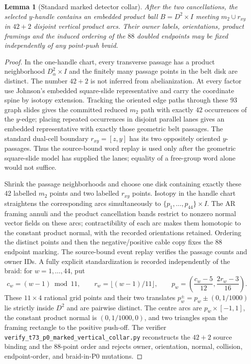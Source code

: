 \documentclass[11pt]{amsart}
\newtheorem{lemma}[theorem]{Lemma}
\theoremstyle{definition}
\theoremstyle{remark}
\begin{document}
\begin{lemma}[Standard marked detector collar]
\label{lem:marked-detector-collar}
After the two cancellations, the selected $y$-handle contains an embedded
product ball $B=D^2\times I$ meeting $m_2\cup r_{xy}$ in $42+2$ disjoint
vertical product arcs.  Their owner labels, orientations, product framings and
the induced ordering of the $88$ doubled endpoints may be fixed independently
of any point-push braid.
\end{lemma}

\begin{proof}
In the one-handle chart, every transverse passage has a product neighborhood
$D^2_\alpha\times I$ and the finitely many passage points in the belt disk are
distinct.  The number $42+2$ is not inferred from abelianization.  At every
factor use Johnson's embedded square-slide representative and carry the
coordinate spine by isotopy extension.  Tracking the oriented edge paths
through these $93$ graph slides gives the committed reduced $m_2$ path with
exactly $42$ occurrences of the $y$-edge; placing repeated occurrences in
disjoint parallel lanes gives an embedded representative with exactly those
geometric belt passages.  The standard dual-cell boundary
$r_{xy}=[z,y]$ has its two oppositely oriented $y$-passages.  Thus the
source-bound word replay is used only after the geometric square-slide model
has supplied the lanes; equality of a free-group word alone would not suffice.

Shrink the passage neighborhoods and choose one disk containing exactly these
42 labelled $m_2$ points and two labelled $r_{xy}$ points.  Isotopy in the
handle chart straightens the corresponding arcs simultaneously to
$\{p_1,\ldots,p_{44}\}\times I$.  The AR framing annuli and the product
cancellation bands restrict to nonzero normal vector fields on these arcs;
contractibility of each arc makes them homotopic to the constant product
normal, with the recorded orientations retained.  Ordering the distinct
points and then the negative/positive cable copy fixes the 88 endpoint marking.
The source-bound event replay verifies the passage counts and owner IDs.  A
fully explicit standardization is recorded independently of the braid: for
$w=1,\ldots,44$, put
\[
c_w=(w-1)\bmod 11,\qquad r_w=\lfloor(w-1)/11\rfloor,\qquad
p_w=\left(\frac{c_w-5}{12},\frac{2r_w-3}{16}\right).
\]
These $11\times4$ rational grid points and their two translates
$p_w^\pm=p_w\pm(0,1/1000)$ lie strictly inside $D^2$ and are pairwise
distinct.  The centre arcs are $p_w\times[-1,1]$, the constant product normal
is $(0,1/1000,0)$, and two triangles span the framing rectangle to the
positive push-off.  The verifier
\texttt{verify\_t73\_p0\_marked\_vertical\_collar.py} reconstructs the
$42+2$ source binding and the 88-point order and rejects owner, orientation,
normal, collision, endpoint-order, and braid-in-P0 mutations.
\end{proof}
\end{document}
